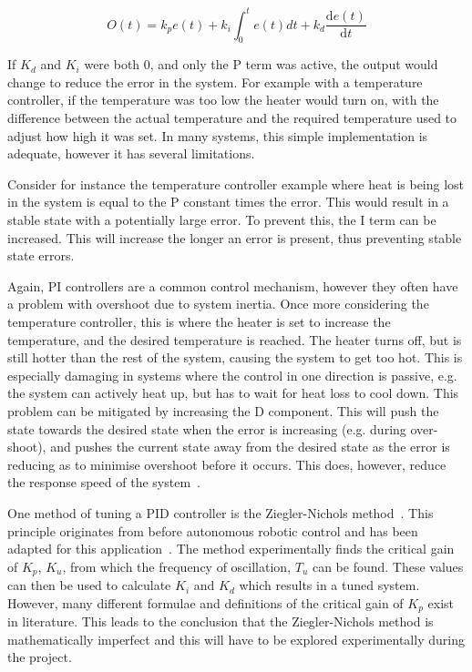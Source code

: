 \begin{equation}
\label{eqn:pid}
O(t) = k_{p}e(t) + k_i\int_{0}^{t}e(t)dt + k_d \frac{\mathrm{d} e(t) }{\mathrm{d} t}
\end{equation}

If $K_d$ and $K_i$ were both 0, and only the P term was active, the output 
would change to reduce the error in the system. For example with a
temperature controller, if the temperature was too low the heater would
turn on, with the difference between the actual temperature and the required 
temperature used to adjust how high it was set. In many systems, this simple 
implementation is adequate, however it has several limitations. 

Consider for instance the temperature controller example where heat is being
lost in the system is equal to the P constant times the error. This would
result in a stable state with a potentially large error. To prevent this,
the I term can be increased. This will increase the longer an error is
present, thus preventing stable state errors. 

Again, PI controllers are a common control mechanism, however they often have 
a problem with overshoot due to system inertia. Once more considering the 
temperature controller, this is where the heater is set to increase the 
temperature, and the desired temperature is reached. The heater turns off, but 
is still hotter than the rest of the system, causing the system to get too hot. 
This is especially damaging in systems where the control in one direction 
is passive, e.g. the system can actively heat up, but has to wait for heat loss 
to cool down. This problem can be mitigated by increasing the D component. 
This will push the state towards the desired state when the error is increasing 
(e.g. during over-shoot), and pushes the current state away from the desired 
state as the error is reducing as to minimise overshoot before it 
occurs. This does, however, reduce the response speed of the system~\cite{chen2007linear}.

One method of tuning a PID controller is the Ziegler-Nichols method~\cite{ziegler1942optimum}. This principle originates from before autonomous 
robotic control and has been adapted for this application~\cite{aastrom2004revisiting}. The method experimentally finds the critical gain 
of $K_p$, $K_u$, from which the frequency of oscillation, $T_u$ can be found. 
These values can then be used to calculate $K_i$ and $K_d$ which results in a 
tuned system. However, many different formulae and definitions of the critical 
gain of $K_p$ exist in literature. This leads to the conclusion that the 
Ziegler-Nichols method is mathematically imperfect and this will have to be 
explored experimentally during the project.



